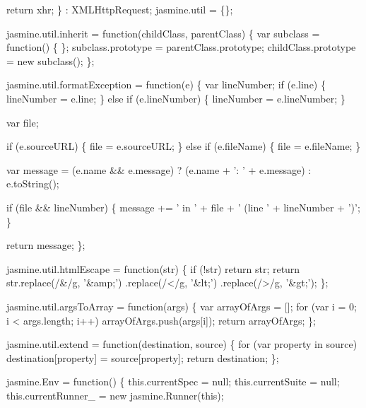 \begin{DoxyCodeInclude}
  \textcolor{keywordflow}{return} xhr;
\} : XMLHttpRequest;
jasmine.util = \{\};

jasmine.util.inherit = \textcolor{keyword}{function}(childClass, parentClass) \{
  var subclass = \textcolor{keyword}{function}() \{
  \};
  subclass.prototype = parentClass.prototype;
  childClass.prototype = \textcolor{keyword}{new} subclass();
\};

jasmine.util.formatException = \textcolor{keyword}{function}(e) \{
  var lineNumber;
  \textcolor{keywordflow}{if} (e.line) \{
    lineNumber = e.line;
  \}
  \textcolor{keywordflow}{else} \textcolor{keywordflow}{if} (e.lineNumber) \{
    lineNumber = e.lineNumber;
  \}

  var file;

  \textcolor{keywordflow}{if} (e.sourceURL) \{
    file = e.sourceURL;
  \}
  \textcolor{keywordflow}{else} \textcolor{keywordflow}{if} (e.fileName) \{
    file = e.fileName;
  \}

  var message = (e.name && e.message) ? (e.name + \textcolor{stringliteral}{': '} + e.message) : e.toString();

  \textcolor{keywordflow}{if} (file && lineNumber) \{
    message += \textcolor{stringliteral}{' in '} + file + \textcolor{stringliteral}{' (line '} + lineNumber + \textcolor{charliteral}{')'};
  \}

  \textcolor{keywordflow}{return} message;
\};

jasmine.util.htmlEscape = \textcolor{keyword}{function}(str) \{
  \textcolor{keywordflow}{if} (!str) \textcolor{keywordflow}{return} str;
  \textcolor{keywordflow}{return} str.replace(/&/g, \textcolor{stringliteral}{'&amp;'})
    .replace(/</g, \textcolor{stringliteral}{'&lt;'})
    .replace(/>/g, \textcolor{stringliteral}{'&gt;'});
\};

jasmine.util.argsToArray = \textcolor{keyword}{function}(args) \{
  var arrayOfArgs = [];
  \textcolor{keywordflow}{for} (var i = 0; i < args.length; i++) arrayOfArgs.push(args[i]);
  \textcolor{keywordflow}{return} arrayOfArgs;
\};

jasmine.util.extend = \textcolor{keyword}{function}(destination, source) \{
  \textcolor{keywordflow}{for} (var property in source) destination[property] = source[property];
  \textcolor{keywordflow}{return} destination;
\};

jasmine.Env = \textcolor{keyword}{function}() \{
  this.currentSpec = null;
  this.currentSuite = null;
  this.currentRunner\_ = \textcolor{keyword}{new} jasmine.Runner(\textcolor{keyword}{this});


\end{DoxyCodeInclude}

